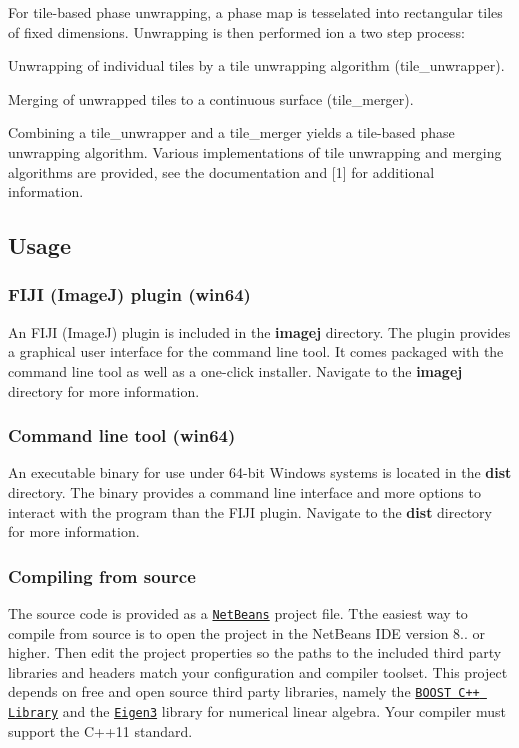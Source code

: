 For tile-\/based phase unwrapping, a phase map is tesselated into rectangular tiles of fixed dimensions. Unwrapping is then performed ion a two step process\-:


\begin{DoxyEnumerate}
\item Unwrapping of individual tiles by a tile unwrapping algorithm (tile\-\_\-unwrapper).
\item Merging of unwrapped tiles to a continuous surface (tile\-\_\-merger).
\end{DoxyEnumerate}

Combining a tile\-\_\-unwrapper and a tile\-\_\-merger yields a tile-\/based phase unwrapping algorithm. Various implementations of tile unwrapping and merging algorithms are provided, see the documentation and \mbox{[}1\mbox{]} for additional information.

\subsection*{Usage}

\subsubsection*{F\-I\-J\-I (Image\-J) plugin (win64)}

An F\-I\-J\-I (Image\-J) plugin is included in the {\bfseries imagej} directory. The plugin provides a graphical user interface for the command line tool. It comes packaged with the command line tool as well as a one-\/click installer. Navigate to the {\bfseries imagej} directory for more information.

\subsubsection*{Command line tool (win64)}

An executable binary for use under 64-\/bit Windows systems is located in the {\bfseries dist} directory. The binary provides a command line interface and more options to interact with the program than the F\-I\-J\-I plugin. Navigate to the {\bfseries dist} directory for more information.

\subsubsection*{Compiling from source}

The source code is provided as a \href{https://netbeans.org/}{\tt Net\-Beans} project file. Tthe easiest way to compile from source is to open the project in the Net\-Beans I\-D\-E version 8.. or higher. Then edit the project properties so the paths to the included third party libraries and headers match your configuration and compiler toolset. This project depends on free and open source third party libraries, namely the \href{https://www.boost.org/}{\tt B\-O\-O\-S\-T C++ Library} and the \href{https://eigen.tuxfamily.org/dox-devel/index.html}{\tt Eigen3} library for numerical linear algebra. Your compiler must support the C++11 standard.


